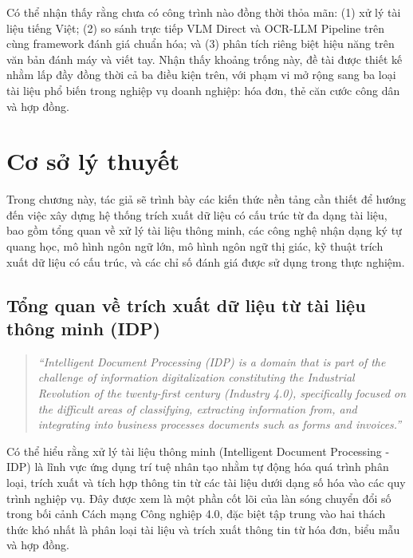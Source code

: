 ﻿\documentclass[12pt]{report}
\begin{document}
Có thể nhận thấy rằng chưa có công trình nào đồng thời thỏa mãn: (1) xử lý tài liệu tiếng Việt; (2) so sánh trực tiếp VLM Direct và OCR-LLM Pipeline trên cùng framework đánh giá chuẩn hóa; và (3) phân tích riêng biệt hiệu năng trên văn bản đánh máy và viết tay. Nhận thấy khoảng trống này, đề tài được thiết kế nhằm lấp đầy đồng thời cả ba điều kiện trên, với phạm vi mở rộng sang ba loại tài liệu phổ biến trong nghiệp vụ doanh nghiệp: hóa đơn, thẻ căn cước công dân và hợp đồng.

\clearpage

\chapter{Cơ sở lý thuyết}

Trong chương này, tác giả sẽ trình bày các kiến thức nền tảng cần thiết để hướng đến việc xây dựng hệ thống trích xuất dữ liệu có cấu trúc từ đa dạng tài liệu, bao gồm tổng quan về xử lý tài liệu thông minh, các công nghệ nhận dạng ký tự quang học, mô hình ngôn ngữ lớn, mô hình ngôn ngữ thị giác, kỹ thuật trích xuất dữ liệu có cấu trúc, và các chỉ số đánh giá được sử dụng trong thực nghiệm.

\section{Tổng quan về trích xuất dữ liệu từ tài liệu thông minh (IDP)}\label{sec:idp}

\begin{quote}
\emph{``Intelligent Document Processing (IDP) is a domain that is part of the challenge of information digitalization constituting the Industrial Revolution of the twenty-first century (Industry 4.0), specifically focused on the difficult areas of classifying, extracting information from, and integrating into business processes documents such as forms and invoices.''} \cite{zhu2021idp}
\end{quote}

Có thể hiểu rằng xử lý tài liệu thông minh (Intelligent Document Processing - IDP) là lĩnh vực ứng dụng trí tuệ nhân tạo nhằm tự động hóa quá trình phân loại, trích xuất và tích hợp thông tin từ các tài liệu dưới dạng số hóa vào các quy trình nghiệp vụ. Đây được xem là một phần cốt lõi của làn sóng chuyển đổi số trong bối cảnh Cách mạng Công nghiệp 4.0, đặc biệt tập trung vào hai thách thức khó nhất là phân loại tài liệu và trích xuất thông tin từ hóa đơn, biểu mẫu và hợp đồng.
\end{document}
